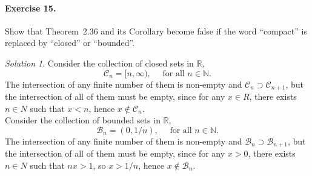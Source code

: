 \documentclass[11pt]{report}
\def\R{\mathbb{R}}
\def\N{\mathbb{N}}
\theoremstyle{remark}
\newtheorem*{solution}{Solution}
\begin{document}
    \paragraph{Exercise 15.} Show that Theorem~2.36 and its Corollary become false
    if the word ``compact'' is replaced by ``closed'' or ``bounded''.
    \begin{solution}
        Consider the collection of closed sets in $\R$, \[
            \mathscr{C}_n = [n, \infty),\quad \text{ for all }n \in \N.
        \] The intersection of any finite number of them is non-empty and
        $\mathscr{C}_n \supset \mathscr{C}_{n + 1}$, but the intersection of all of
        them must be empty, since for any $x \in R$, there exists $n \in N$ such
        that $x < n$, hence $x \notin \mathscr{C}_n$. \\

        Consider the collection of bounded sets in $\R$, \[
            \mathscr{B}_n = (0, 1 / n),\quad \text{ for all }n \in \N.
        \] The intersection of any finite number of them is non-empty and
        $\mathscr{B}_n \supset \mathscr{B}_{n + 1}$, but the intersection of all of
        them must be empty, since for any $x > 0$, there exists $n \in N$ such that
        $nx > 1$, so $x > 1 / n$, hence $x \notin \mathscr{B}_n$.
    \end{solution}
\end{document}
